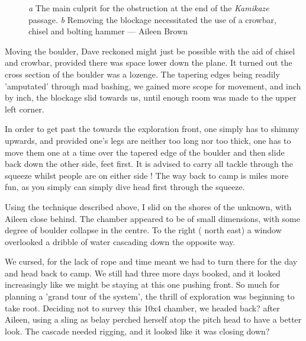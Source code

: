 \begin{figure}[t!]
\checkoddpage \ifoddpage \forcerectofloat \else \forceversofloat \fi
\centering
    \begin{subfigure}[t]{0.423\textwidth}
        \centering
        \caption{} \label{boulder_kamikaze}
    \end{subfigure}
        \hfill
\begin{subfigure}[t]{0.567\textwidth}
\centering
{}
 \caption{}\label{end of kamikaze}
\end{subfigure}
  \caption{
    \emph{a} The main culprit for the obstruction at the end of the \emph{Kamikaze} passage. 
     \emph{b}  Removing the blockage necessitated the use of a crowbar, chisel and bolting hammer --- Aileen Brown }
\end{figure}


Moving the boulder, Dave reckoned might just be possible with the aid of chisel and crowbar, provided there was space lower down the plane. It turned out the cross section of the boulder was a lozenge. The tapering edges being readily 'amputated' through mad bashing, we gained more scope for movement, and inch by inch, the blockage slid towards us, until enough room was made to the upper left corner.

In order to get past the  towards the exploration front, one simply has to shimmy upwards, and provided one's legs are neither too long nor too thick, one has to move them one at a time over the tapered edge of the boulder and then slide back down the other side, feet first. It is advised to carry all tackle through the squeeze whilst people are on either side ! The way back to camp is miles more fun, as you simply can simply dive head first through the squeeze.

Using the technique described above, I slid on the shores of the unknown, with Aileen close behind. The chamber appeared to be of small dimensions, with some degree of boulder collapse in the centre. To the right ( north east) a window overlooked a dribble of water cascading down the opposite way.

We cursed, for the lack of rope and time meant we had to turn there for the day and head back to camp. We still had three more days booked, and it looked increasingly like we might be staying at this one pushing front. So much for planning a 'grand tour of the system', the thrill of exploration was beginning to take root. Deciding not to survey this 10x4 chamber, we headed back? after Aileen, using a sling as belay perched herself atop the pitch head to have a better look. The cascade needed rigging, and it looked like it was closing down?

